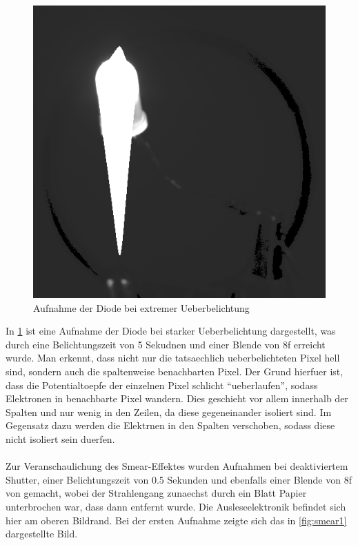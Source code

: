 \begin{figure}[h!]
\centering
        \includegraphics[width=.4\textwidth]{blooming.png}
\caption{ Aufnahme der Diode bei extremer Ueberbelichtung }
\label{fig:blooming}
\end{figure}
In \ref{fig:blooming} ist eine Aufnahme der Diode bei starker Ueberbelichtung dargestellt, was durch eine Belichtungszeit von 5 Sekudnen und einer Blende von 8f erreicht wurde. Man erkennt, dass nicht nur die tatsaechlich ueberbelichteten Pixel hell sind, sondern auch die spaltenweise benachbarten Pixel. Der Grund hierfuer ist, dass die Potentialtoepfe der einzelnen Pixel schlicht \enquote{ueberlaufen}, sodass Elektronen in benachbarte Pixel wandern. Dies geschieht vor allem innerhalb der Spalten und nur wenig in den Zeilen, da diese gegeneinander isoliert sind. Im Gegensatz dazu werden die Elektrnen in den Spalten verschoben, sodass diese nicht isoliert sein duerfen. \\ \\
Zur Veranschaulichung des Smear-Effektes wurden Aufnahmen bei deaktiviertem Shutter, einer Belichtungszeit von 0.5 Sekunden und ebenfalls einer Blende von 8f von gemacht, wobei der Strahlengang zunaechst durch ein Blatt Papier unterbrochen war, dass dann entfernt wurde. Die Ausleseelektronik befindet sich hier am oberen Bildrand. 
Bei der ersten Aufnahme zeigte sich das in \ref{fig:smear1} dargestellte Bild. 


